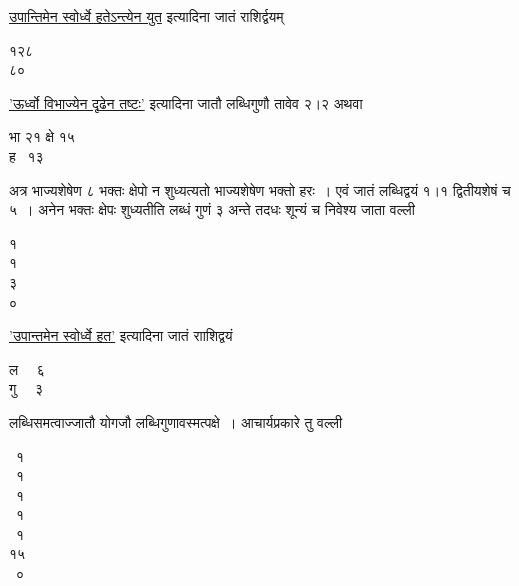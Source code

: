 \documentclass[11pt, openany]{book}
\begin{document}
\newpage

\begin{sloppypar}
\noindent \hyperref[5.51]{उपान्तिमेन स्वोर्ध्वे हतेऽन्त्येन युत} इत्यादिना जातं राशिर्द्वयम्
\vspace{-1mm}

\begin{center}
१२८\\
८०~~
\end{center}
\vspace{-1mm}

\noindent \hyperref[5.51]{'ऊर्ध्वो विभाज्येन दृढेन तष्टः'} इत्यादिना जातौ लब्धिगुणौ तावेव २।२ अथवा
\vspace{-1mm}

\begin{center}
भा २१ क्षे १५\\
ह ~१३ ~~~~~~~~~
\end{center}
\vspace{-1mm}

\noindent अत्र भाज्यशेषेण ८ भक्तः क्षेपो न शुध्यत्यतो भाज्यशेषेण भक्तो हरः~। एवं जातं लब्धिद्वयं १।१ द्वितीयशेषं च ५~। अनेन भक्तः क्षेपः शुध्यतीति लब्धं गुणं ३ अन्ते तदधः शून्यं च निवेश्य जाता वल्ली
\vspace{-1mm}

\begin{center}
१\\
१\\
३\\
०
\end{center}
\vspace{-1mm}

\noindent \hyperref[5.51]{'उपान्तमेन स्वोर्ध्वे हत'} इत्यादिना जातं रााशिद्वयं
\vspace{-1mm}

\begin{center}
ल ~~६ \\
गु ~~३
\end{center}
\vspace{-1mm}

\noindent लब्धिसमत्वाज्जातौ योगजौ लब्धिगुणावस्मत्पक्षे~। आचार्यप्रकारे तु वल्ली
\vspace{-1mm}

\begin{center}
~१\\
~१\\
~१\\
~१\\
~१\\
१५\\
~०
\end{center}
\vspace{-1mm}


\end{sloppypar}
\end{document}
